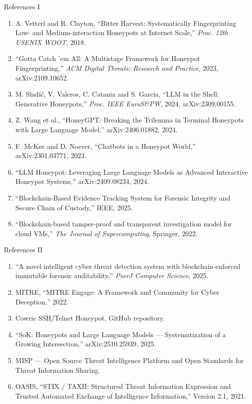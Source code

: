 \documentclass[aspectratio=169,11pt]{beamer}
\begin{document}
\begin{frame}{References I}
  \scriptsize
  \begin{enumerate}\setlength\itemsep{2.5pt}
    \item A. Vetterl and R. Clayton, ``Bitter Harvest: Systematically Fingerprinting Low- and
      Medium-interaction Honeypots at Internet Scale,'' \emph{Proc. 12th USENIX WOOT}, 2018.
    \item ``Gotta Catch 'em All: A Multistage Framework for Honeypot Fingerprinting,''
      \emph{ACM Digital Threats: Research and Practice}, 2023, arXiv:2109.10652.
    \item M. Slad\'{i}\'{c}, V. Valeros, C. Catania and S. Garcia, ``LLM in the Shell: Generative
      Honeypots,'' \emph{Proc. IEEE EuroS\&PW}, 2024, arXiv:2309.00155.
    \item Z. Wang et al., ``HoneyGPT: Breaking the Trilemma in Terminal Honeypots with Large
      Language Model,'' arXiv:2406.01882, 2024.
    \item F. McKee and D. Noever, ``Chatbots in a Honeypot World,'' arXiv:2301.03771, 2023.
    \item ``LLM Honeypot: Leveraging Large Language Models as Advanced Interactive Honeypot
      Systems,'' arXiv:2409.08234, 2024.
    \item ``Blockchain-Based Evidence Tracking System for Forensic Integrity and Secure Chain of
      Custody,'' IEEE, 2025.
    \item ``Blockchain-based tamper-proof and transparent investigation model for cloud VMs,''
      \emph{The Journal of Supercomputing}, Springer, 2022.
  \end{enumerate}
\end{frame}

\begin{frame}{References II}
  \scriptsize
  \begin{enumerate}\setlength\itemsep{2.5pt}\setcounter{enumi}{8}
    \item ``A novel intelligent cyber threat detection system with blockchain-enforced immutable
      forensic auditability,'' \emph{PeerJ Computer Science}, 2025.
    \item MITRE, ``MITRE Engage: A Framework and Community for Cyber Deception,'' 2022.
    \item Cowrie SSH/Telnet Honeypot, GitHub repository.
    \item ``SoK: Honeypots and Large Language Models --- Systematization of a Growing
      Intersection,'' arXiv:2510.25939, 2025.
    \item MISP --- Open Source Threat Intelligence Platform and Open Standards for Threat
      Information Sharing.
    \item OASIS, ``STIX / TAXII: Structured Threat Information Expression and Trusted Automated
      Exchange of Intelligence Information,'' Version 2.1, 2021.
  \end{enumerate}
\end{frame}
\end{document}
